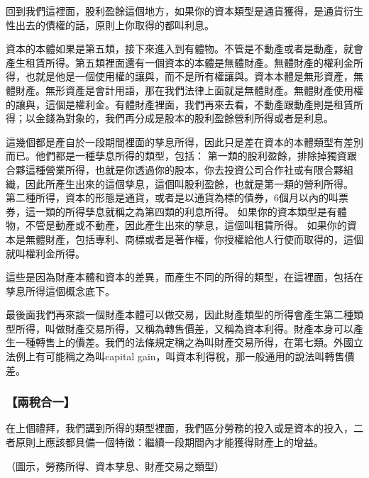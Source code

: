 \documentclass[oneside,sub3section]{ctexbook}
\begin{document}
回到我們這裡面，股利盈餘這個地方，如果你的資本類型是通貨獲得，是通貨衍生性出去的債權的話，原則上你取得的都叫利息。

資本的本體如果是第五類，接下來進入到有體物。不管是不動產或者是動產，就會產生租賃所得。第五類裡面還有一個資本的本體是無體財產。無體財產的權利金所得，也就是他是一個使用權的讓與，而不是所有權讓與。資本本體是無形資產，無體財產。無形資產是會計用語，那在我們法律上面就是無體財產。無體財產使用權的讓與，這個是權利金。有體財產裡面，我們再來去看，不動產跟動產則是租賃所得；以金錢為對象的，我們再分成是股本的股利盈餘營利所得或者是利息。

這幾個都是產自於一段期間裡面的孳息所得，因此只是差在資本的本體類型有差別而已。他們都是一種孳息所得的類型，包括：
第一類的股利盈餘，排除掉獨資跟合夥這種營業所得，也就是你透過你的股本，你去投資公司合作社或有限合夥組織，因此所產生出來的這個孳息，這個叫股利盈餘，也就是第一類的營利所得。
第二種所得，資本的形態是通貨，或者是以通貨為標的債券，6個月以內的叫票券，這一類的所得孳息就稱之為第四類的利息所得。
如果你的資本類型是有體物，不管是動產或不動產，因此產生出來的孳息，這個叫租賃所得。
如果你的資本是無體財產，包括專利、商標或者是著作權，你授權給他人行使而取得的，這個就叫權利金所得。

這些是因為財產本體和資本的差異，而產生不同的所得的類型，在這裡面，包括在孳息所得這個概念底下。

最後面我們再來談一個財產本體可以做交易，因此財產類型的所得會產生第二種類型所得，叫做財產交易所得，又稱為轉售價差，又稱為資本利得。財產本身可以產生一種轉售上的價差。我們的法條規定稱之為叫財產交易所得，在第七類。外國立法例上有可能稱之為叫capital gain，叫資本利得稅，那一般通用的說法叫轉售價差。

\hypertarget{ux5169ux7a05ux5408ux4e00}{%
\subsubsection{【兩稅合一】}\label{ux5169ux7a05ux5408ux4e00}}

在上個禮拜，我們講到所得的類型裡面，我們區分勞務的投入或是資本的投入，二者原則上應該都具備一個特徵：繼續一段期間內才能獲得財產上的增益。

（圖示，勞務所得、資本孳息、財產交易之類型）
\end{document}
